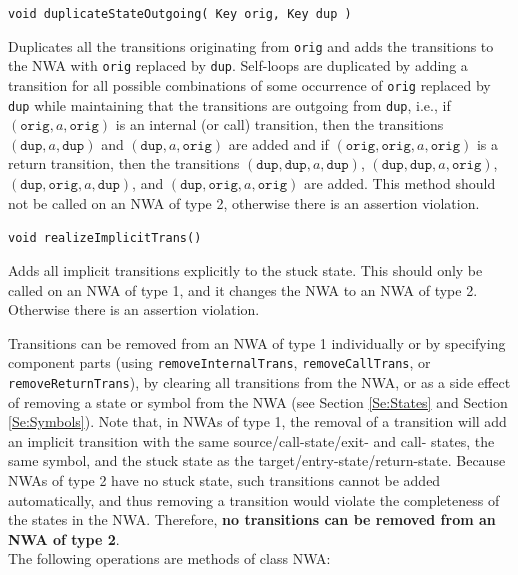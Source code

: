\documentclass{llncs}
\begin{document}
\begin{description}
  \item\texttt{void duplicateStateOutgoing( Key orig, Key dup )} \nopagebreak

    Duplicates all the transitions originating from \texttt{orig} and adds the transitions to the NWA with \texttt{orig} replaced by \texttt{dup}.  Self-loops are duplicated by adding a transition for all possible combinations of some occurrence of \texttt{orig} replaced by \texttt{dup} while maintaining that the transitions are outgoing from \texttt{dup}, i.e., if $(\texttt{orig},a,\texttt{orig})$ is an internal (or call) transition, then the transitions $(\texttt{dup},a,\texttt{dup})$ and $(\texttt{dup},a,\texttt{orig})$ are added and if $(\texttt{orig},\texttt{orig},a,\texttt{orig})$ is a return transition, then the transitions $(\texttt{dup},\texttt{dup},a,\texttt{dup})$, $(\texttt{dup},\texttt{dup},a,\texttt{orig})$, $(\texttt{dup},\texttt{orig},a,\texttt{dup})$, and $(\texttt{dup},\texttt{orig},a,\texttt{orig})$ are added.  This method should not be called on an NWA of type 2, otherwise there is an assertion violation.

  \item\texttt{void realizeImplicitTrans()} \nopagebreak

    Adds all implicit transitions explicitly to the stuck state.  This should only be called on an NWA of type 1, and it changes the NWA to an NWA of type 2.  Otherwise there is an assertion violation. \\

\end{description} 

Transitions can be removed from an NWA of type 1 individually or by specifying component parts (using \texttt{removeInternalTrans}, \texttt{removeCallTrans}, or \texttt{removeReturnTrans}), by clearing all transitions from the NWA, or as a side effect of removing a state or symbol from the NWA (see Section \ref{Se:States} and Section \ref{Se:Symbols}).  Note that, in NWAs of type 1, the removal of a transition will add an implicit transition with the same source/call-state/exit- and call- states, the same symbol, and the stuck state as the target/entry-state/return-state.  Because NWAs of type 2 have no stuck state, such transitions cannot be added automatically, and thus removing a transition would violate the completeness of the states in the NWA.  Therefore, \textbf{no transitions can be removed from an NWA of type 2}. \\ 

\noindent The following operations are methods of class NWA:
\end{document}
